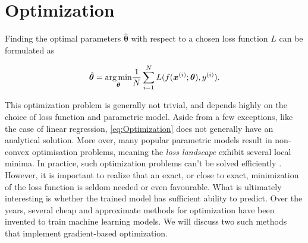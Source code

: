 \section{Optimization}\label{sec:Optimization}
Finding the optimal parameters $\hat{\boldsymbol{\theta}}$ with respect to a chosen loss function $L$ can be formulated as

\begin{equation}\label{eq:Optimization}
    \hat{\boldsymbol{\theta}} = \underset{\boldsymbol{\theta}}{\operatorname*{arg\,min}} \frac{1}{N}\sum_{i=1}^{N} L(f(\boldsymbol{x}^{(i)}; \boldsymbol{\theta}) , y^{(i)}).
\end{equation}

This optimization problem is generally not trivial, and depends highly on the choice of loss function and parametric model. Aside from a few exceptions, like the case of linear regression, \autoref{eq:Optimization} does not generally have an analytical solution. More over, many popular parametric models result in non-convex optimisation problems, meaning the \emph{loss landscape} exhibit several local minima. In practice, such optimization problems can't be solved efficiently \cite{Vava:book}. However, it is important to realize that an exact, or close to exact, minimization of the loss function is seldom needed or even favourable. What is ultimately interesting is whether the trained model has sufficient ability to predict. Over the years, several cheap and approximate methods for optimization have been invented to train machine learning models. We will discuss two such methods that implement gradient-based optimization. 



